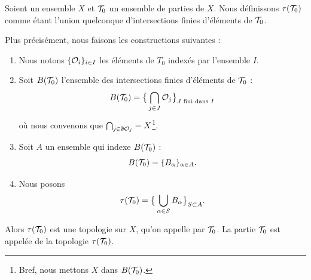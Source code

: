 \begin{propositionDef}\label{DefTopologieEngendree}
    Soient un ensemble \( X \) et \( \mathcal{T}_0 \) un ensemble de parties de \( X \). Nous définissons \( \tau(\mathcal{T}_0)\) comme étant l'union quelconque d'intersections finies d'éléments de \( \mathcal{T}_0 \). 

    Plus précisément, nous faisons les constructions suivantes :
    \begin{enumerate}
        \item
            Nous notons \( \{\mathcal{O}_i \}_{i\in I}\) les éléments de \( T_0\) indexés par l'ensemble \( I\).
        \item 
            Soit  \( B(\mathcal{T}_0)\) l'ensemble des intersections finies d'éléments de \( \mathcal{T}_0\) :
            \begin{equation}
                B(\mathcal{T}_0)=\big\{ \bigcap_{j\in J}\mathcal{O}_j \big\}_{J\text{ fini dans }I}
            \end{equation}
            où nous convenons que \( \bigcap_{j\in\emptyset \mathcal{O}_j}=X\)\footnote{Bref, nous mettons \( X\) dans \( B(\mathcal{T}_0)\).}.
        \item
            Soit \( A\) un ensemble qui indexe \(   B(\mathcal{T}_0) \) :
            \begin{equation}
                B(\mathcal{T}_0)=\{ B_{\alpha} \}_{\alpha\in A}.
            \end{equation}
        \item 
            Nous posons
            \begin{equation}
                \tau(\mathcal{T}_0)=\big\{    \bigcup_{\alpha\in S}B_{\alpha}   \big\}_{S\subset A}.
            \end{equation}
    \end{enumerate}
    Alors \( \tau(\mathcal{T}_0) \) est une topologie sur \(X\), qu'on appelle  par \( \mathcal{T}_0 \). La partie \( \mathcal{T}_0\) est appelée  de la topologie \(  \tau(\mathcal{T}_0)  \).
\end{propositionDef}

